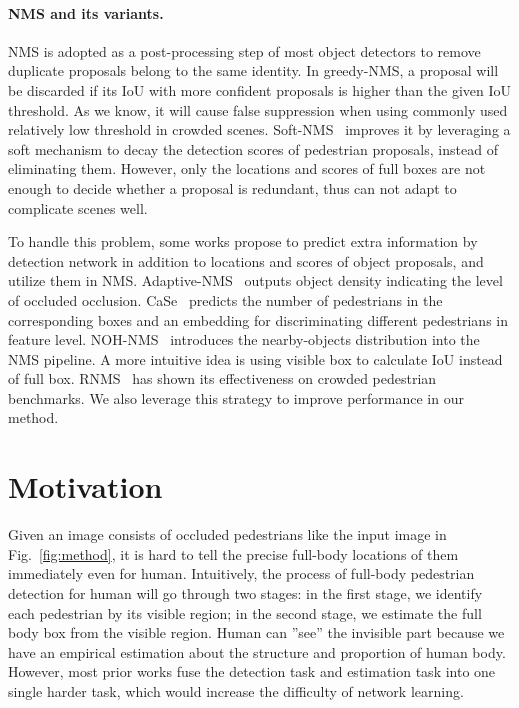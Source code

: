 \documentclass[10pt,twocolumn,letterpaper]{article}
\begin{document}
\paragraph{NMS and its variants.}
NMS is adopted as a post-processing step of most object detectors to remove duplicate proposals belong to the same identity. In greedy-NMS, a proposal will be discarded if its IoU with more confident proposals is higher than the given IoU threshold. As we know, it will cause false suppression when using commonly used relatively low threshold in crowded scenes. Soft-NMS~\cite{softnms} improves it by leveraging a soft mechanism to decay the detection scores of pedestrian proposals, instead of eliminating them. However, only the locations and scores of full boxes are not enough to decide whether a proposal is redundant, thus can not adapt to complicate scenes well.

To handle this problem, some works propose to predict extra information by detection network in addition to locations and scores of object proposals, and utilize them in NMS. Adaptive-NMS~\cite{adaptiveNMS} outputs object density indicating the level of occluded occlusion. CaSe~\cite{xie2020count} predicts the number of pedestrians in the corresponding boxes and an embedding for discriminating different pedestrians in feature level. NOH-NMS~\cite{zhou2020NOH-NMS} introduces the nearby-objects distribution into the NMS pipeline. A more intuitive idea is using visible box to calculate IoU instead of full box. RNMS~\cite{huang2020R2nms} has shown its effectiveness on crowded pedestrian benchmarks. We also leverage this strategy to improve performance in our method.

\section{Motivation}
Given an image consists of occluded pedestrians like the input image in Fig.~\ref{fig:method}, it is hard to tell the precise full-body locations of them immediately even for human. Intuitively, the process of full-body pedestrian detection for human will go through two stages: in the first stage, we identify each pedestrian by its visible region; in the second stage, we estimate the full body box from the visible region. Human can ''see'' the invisible part because we have an empirical estimation about the structure and proportion of human body. However, most prior works fuse the detection task and estimation task into one single harder task, which would increase the difficulty of network learning.
\end{document}
